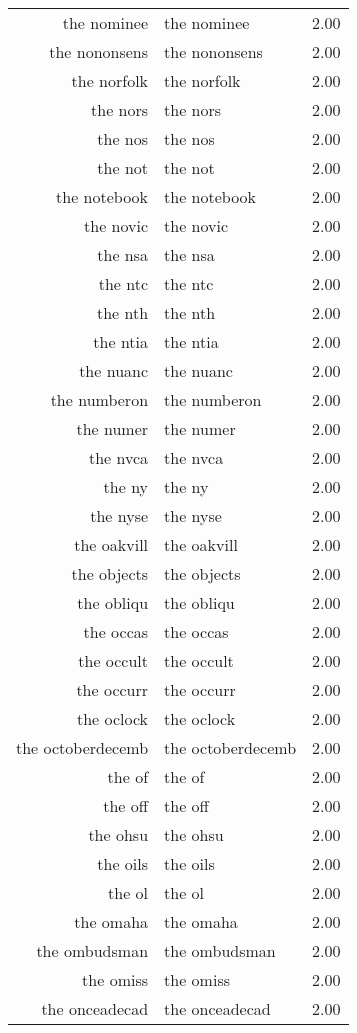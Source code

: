 \begin{table}[ht]
\begin{tabular}{rlr}
  the nominee & the nominee & 2.00 \\ 
  the nononsens & the nononsens & 2.00 \\ 
  the norfolk & the norfolk & 2.00 \\ 
  the nors & the nors & 2.00 \\ 
  the nos & the nos & 2.00 \\ 
  the not & the not & 2.00 \\ 
  the notebook & the notebook & 2.00 \\ 
  the novic & the novic & 2.00 \\ 
  the nsa & the nsa & 2.00 \\ 
  the ntc & the ntc & 2.00 \\ 
  the nth & the nth & 2.00 \\ 
  the ntia & the ntia & 2.00 \\ 
  the nuanc & the nuanc & 2.00 \\ 
  the numberon & the numberon & 2.00 \\ 
  the numer & the numer & 2.00 \\ 
  the nvca & the nvca & 2.00 \\ 
  the ny & the ny & 2.00 \\ 
  the nyse & the nyse & 2.00 \\ 
  the oakvill & the oakvill & 2.00 \\ 
  the objects & the objects & 2.00 \\ 
  the obliqu & the obliqu & 2.00 \\ 
  the occas & the occas & 2.00 \\ 
  the occult & the occult & 2.00 \\ 
  the occurr & the occurr & 2.00 \\ 
  the oclock & the oclock & 2.00 \\ 
  the octoberdecemb & the octoberdecemb & 2.00 \\ 
  the of & the of & 2.00 \\ 
  the off & the off & 2.00 \\ 
  the ohsu & the ohsu & 2.00 \\ 
  the oils & the oils & 2.00 \\ 
  the ol & the ol & 2.00 \\ 
  the omaha & the omaha & 2.00 \\ 
  the ombudsman & the ombudsman & 2.00 \\ 
  the omiss & the omiss & 2.00 \\ 
  the onceadecad & the onceadecad & 2.00 \\ 

\end{tabular}
\end{table}
